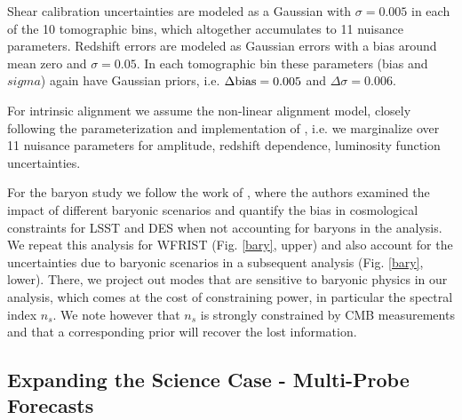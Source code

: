 Shear calibration uncertainties are modeled as a Gaussian with $\sigma=0.005$ in each of the 10 tomographic bins, which altogether accumulates to 11 nuisance parameters. Redshift errors are modeled as Gaussian errors with a bias around mean zero and $\sigma=0.05$. In each tomographic bin these parameters (bias and $sigma$) again have Gaussian priors, i.e. $\Delta \mathrm{bias}=0.005$ and $\Delta \sigma=0.006$. 

For intrinsic alignment we assume the non-linear alignment model, closely following the parameterization and implementation of \cite{Krause16}, i.e. we marginalize over 11 nuisance parameters for amplitude, redshift dependence, luminosity function uncertainties.

For the baryon study we follow the work of \cite{Eifler15}, where the authors examined the impact of different baryonic scenarios and quantify the bias in cosmological constraints for LSST and DES when not accounting for baryons in the analysis. We repeat this analysis for WFRIST (Fig. \ref{bary}, upper) and also account for the uncertainties due to baryonic scenarios in a subsequent analysis (Fig. \ref{bary}, lower). There, we project out modes that are sensitive to baryonic physics in our analysis, which comes at the cost of constraining power, in particular the spectral index $n_s$. We note however that $n_s$ is strongly constrained by CMB measurements and that a corresponding prior will recover the lost information.


\subsection{Expanding the Science Case - Multi-Probe Forecasts}


